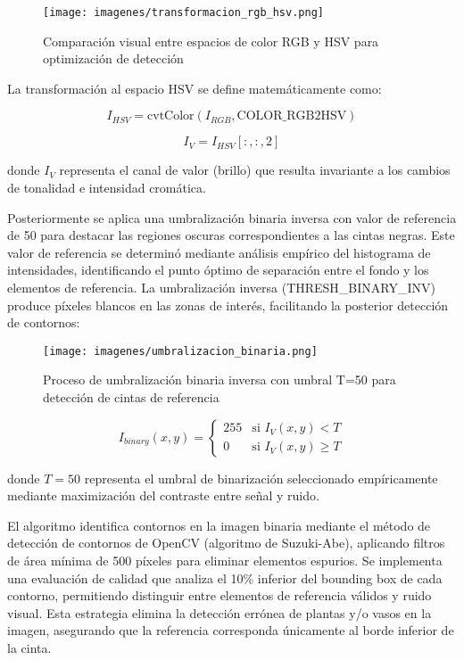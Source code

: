 \begin{figure}[h]
\centering
\texttt{[image: imagenes/transformacion\_rgb\_hsv.png]}
\caption{Comparación visual entre espacios de color RGB y HSV para optimización de detección}
\label{fig:transformacion_rgb_hsv}
\end{figure}

La transformación al espacio HSV se define matemáticamente como:

\begin{equation}
I_{HSV} = \text{cvtColor}(I_{RGB}, \text{COLOR\_RGB2HSV})
\end{equation}

\begin{equation}
I_V = I_{HSV}[:,:,2]
\end{equation}

donde $I_V$ representa el canal de valor (brillo) que resulta invariante a los cambios de tonalidad e intensidad cromática.

Posteriormente se aplica una umbralización binaria inversa con valor de referencia de 50 para destacar las regiones oscuras correspondientes a las cintas negras. Este valor de referencia se determinó mediante análisis empírico del histograma de intensidades, identificando el punto óptimo de separación entre el fondo y los elementos de referencia. La umbralización inversa (THRESH\_BINARY\_INV) produce píxeles blancos en las zonas de interés, facilitando la posterior detección de contornos:

\begin{figure}[h]
\centering
\texttt{[image: imagenes/umbralizacion\_binaria.png]}
\caption{Proceso de umbralización binaria inversa con umbral T=50 para detección de cintas de referencia}
\label{fig:umbralizacion_binaria}
\end{figure}

\begin{equation}
I_{binary}(x,y) = \begin{cases} 
255 & \text{si } I_V(x,y) < T \\
0 & \text{si } I_V(x,y) \geq T
\end{cases}
\end{equation}

donde $T = 50$ representa el umbral de binarización seleccionado empíricamente mediante maximización del contraste entre señal y ruido.

El algoritmo identifica contornos en la imagen binaria mediante el método de detección de contornos de OpenCV (algoritmo de Suzuki-Abe), aplicando filtros de área mínima de 500 píxeles para eliminar elementos espurios. Se implementa una evaluación de calidad que analiza el 10\% inferior del bounding box de cada contorno, permitiendo distinguir entre elementos de referencia válidos y ruido visual. Esta estrategia elimina la detección errónea de plantas y/o vasos en la imagen, asegurando que la referencia corresponda únicamente al borde inferior de la cinta.


